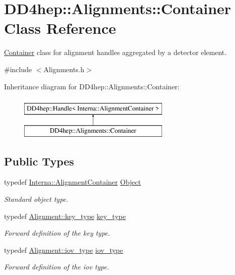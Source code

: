 \hypertarget{class_d_d4hep_1_1_alignments_1_1_container}{}\section{D\+D4hep\+:\+:Alignments\+:\+:Container Class Reference}
\label{class_d_d4hep_1_1_alignments_1_1_container}


\hyperlink{class_d_d4hep_1_1_alignments_1_1_container}{Container} class for alignment handles aggregated by a detector element.  




{\ttfamily \#include $<$Alignments.\+h$>$}

Inheritance diagram for D\+D4hep\+:\+:Alignments\+:\+:Container\+:\begin{figure}[H]
\begin{center}
\leavevmode
\includegraphics[height=2.000000cm]{class_d_d4hep_1_1_alignments_1_1_container}
\end{center}
\end{figure}
\subsection*{Public Types}
\begin{DoxyCompactItemize}
\item 
typedef \hyperlink{class_d_d4hep_1_1_alignments_1_1_interna_1_1_alignment_container}{Interna\+::\+Alignment\+Container} \hyperlink{class_d_d4hep_1_1_alignments_1_1_container_aac463478e91949b594ffe837fd9bd9a8}{Object}
\begin{DoxyCompactList}\small\item\em Standard object type. \end{DoxyCompactList}\item 
typedef \hyperlink{class_d_d4hep_1_1_alignments_1_1_alignment_ab824a65f935a0c79b9ea1a7a85014b88}{Alignment\+::key\+\_\+type} \hyperlink{class_d_d4hep_1_1_alignments_1_1_container_a4101ffa946cedbaf996682533e57c44e}{key\+\_\+type}
\begin{DoxyCompactList}\small\item\em Forward definition of the key type. \end{DoxyCompactList}\item 
typedef \hyperlink{class_d_d4hep_1_1_alignments_1_1_alignment_afd988c803da5a514d8fa255784f29462}{Alignment\+::iov\+\_\+type} \hyperlink{class_d_d4hep_1_1_alignments_1_1_container_a0da2fec1e4433deea86defda82886128}{iov\+\_\+type}
\begin{DoxyCompactList}\small\item\em Forward definition of the iov type. \end{DoxyCompactList}\end{DoxyCompactItemize}
